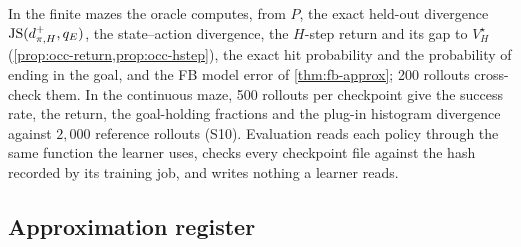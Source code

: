 In the finite mazes the oracle computes, from $P$, the exact held-out divergence $\mathrm{JS}(d^+_{\pi,H},q_E)$, the state--action divergence, the $H$-step return and its gap to $V^\star_H$ (\cref{prop:occ-return,prop:occ-hstep}), the exact hit probability and the probability of ending in the goal, and the FB model error of \cref{thm:fb-approx}; 200 rollouts cross-check them.
In the continuous maze, 500 rollouts per checkpoint give the success rate, the return, the goal-holding fractions and the plug-in histogram divergence against $2{,}000$ reference rollouts (S10).
Evaluation reads each policy through the same function the learner uses, checks every checkpoint file against the hash recorded by its training job, and writes nothing a learner reads.

\subsection{Approximation register}

